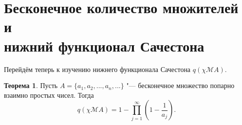 \documentclass[a4paper,openbib]{article}
\theoremstyle{definition}
\newtheorem{theorem}[lemma]{Теорема}
\begin{document}
\section{Бесконечное количество множителей и \\ нижний функционал Сачестона}


Перейдём теперь к изучению нижнего функционала Сачестона $q(\chi\mathscr{M}A)$.

\begin{theorem}
	\label{thm:ac0_primes_p_psi_A_prod}
	Пусть $A = \{a_1, a_2, ..., a_n,...\}$ "--- бесконечное множество попарно взаимно простых чисел.
	Тогда
	\begin{equation}
		q(\chi\mathscr{M}A) = 1-\prod_{j=1}^\infty \left(1-\frac{1}{a_j}\right)
		.
	\end{equation}
\end{theorem}
\end{document}
